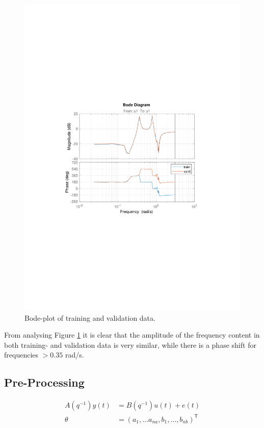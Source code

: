 \documentclass[]{article}
\begin{document}
\begin{figure}[ht]
\centering
\includegraphics[trim= 10cm 8cm 10cm 8cm, scale=0.6]{figures/bode-train_valid.pdf}
\caption{Bode-plot of training and validation data.}
\label{fig:bode-train_valid}
\end{figure}
From analysing Figure \ref{fig:bode-train_valid} it is clear that the amplitude of the frequency content in both training- and validation data is very similar, while there is a phase shift for frequencies $>0.35$ rad/s.

\subsection{Pre-Processing}

\ifx
\begin{align}
	\label{eq:}
	A(q^{-1})y(t) &= B(q^{-1})u(t) + e(t) \\
	\theta &= (a_1, \ldots a_{na}, b_1, \ldots, b_{nb})^\mathsf{T}
\end{align}
\end{document}
